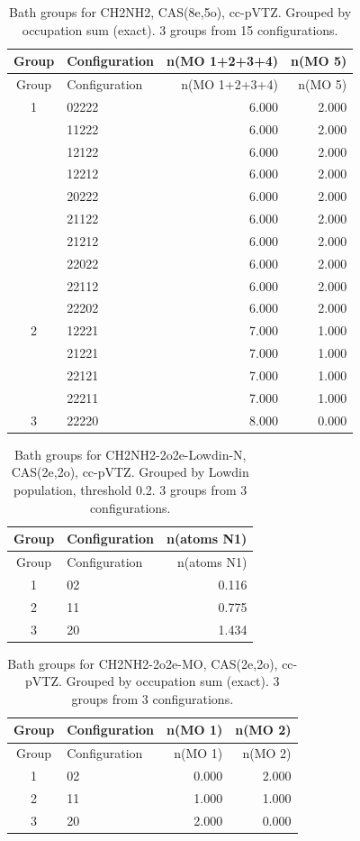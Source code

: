 \begin{longtable}{c l rr}
\caption{Bath groups for CH2NH2, CAS(8e,5o), cc-pVTZ. Grouped by occupation sum (exact). 3 groups from 15 configurations.}\\
\hline
Group & Configuration & n(MO 1+2+3+4) & n(MO 5) \\
\hline
\endfirsthead
\hline
Group & Configuration & n(MO 1+2+3+4) & n(MO 5) \\
\hline
\endhead
1 & 02222 & 6.000 & 2.000 \\
 & 11222 & 6.000 & 2.000 \\
 & 12122 & 6.000 & 2.000 \\
 & 12212 & 6.000 & 2.000 \\
 & 20222 & 6.000 & 2.000 \\
 & 21122 & 6.000 & 2.000 \\
 & 21212 & 6.000 & 2.000 \\
 & 22022 & 6.000 & 2.000 \\
 & 22112 & 6.000 & 2.000 \\
 & 22202 & 6.000 & 2.000 \\
\hline
2 & 12221 & 7.000 & 1.000 \\
 & 21221 & 7.000 & 1.000 \\
 & 22121 & 7.000 & 1.000 \\
 & 22211 & 7.000 & 1.000 \\
\hline
3 & 22220 & 8.000 & 0.000 \\
\hline
\end{longtable}

\begin{longtable}{c l r}
\caption{Bath groups for CH2NH2-2o2e-Lowdin-N, CAS(2e,2o), cc-pVTZ. Grouped by Lowdin population, threshold 0.2. 3 groups from 3 configurations.}\\
\hline
Group & Configuration & n(atoms N1) \\
\hline
\endfirsthead
\hline
Group & Configuration & n(atoms N1) \\
\hline
\endhead
1 & 02 & 0.116 \\
\hline
2 & 11 & 0.775 \\
\hline
3 & 20 & 1.434 \\
\hline
\end{longtable}

\begin{longtable}{c l rr}
\caption{Bath groups for CH2NH2-2o2e-MO, CAS(2e,2o), cc-pVTZ. Grouped by occupation sum (exact). 3 groups from 3 configurations.}\\
\hline
Group & Configuration & n(MO 1) & n(MO 2) \\
\hline
\endfirsthead
\hline
Group & Configuration & n(MO 1) & n(MO 2) \\
\hline
\endhead
1 & 02 & 0.000 & 2.000 \\
\hline
2 & 11 & 1.000 & 1.000 \\
\hline
3 & 20 & 2.000 & 0.000 \\
\hline
\end{longtable}
